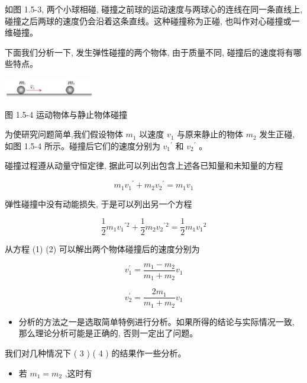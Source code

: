 \documentclass[10pt]{article}
\begin{document}
如图 1.5-3, 两个小球相碰, 碰撞之前球的运动速度与两球心的连线在同一条直线上, 碰撞之后两球的速度仍会沿着这条直线。这种碰撞称为正碰, 也叫作对心碰撞或一维碰撞。

下面我们分析一下, 发生弹性碰撞的两个物体, 由于质量不同, 碰撞后的速度将有哪些特点。

\begin{center}
\includegraphics[max width=0.3\textwidth]{images/01910e4c-ebb8-7d2c-8f2f-2375bc1d2d12_27_408165.jpg}
\end{center}

图 1.5-4 运动物体与静止物体碰撞

为使研究问题简单,我们假设物体 \({m}_{1}\) 以速度 \({v}_{1}\) 与原来静止的物体 \({m}_{2}\) 发生正碰,如图 1.5-4 所示。碰撞后它们的速度分别为 \({v}_{1}{}^{\prime }\) 和 \({v}_{2}{}^{\prime }\) 。

碰撞过程遵从动量守恒定律, 据此可以列出包含上述各已知量和未知量的方程

\[
{m}_{1}{v}_{1}{}^{\prime } + {m}_{2}{v}_{2}{}^{\prime } = {m}_{1}{v}_{1} \tag{1}
\]

弹性碰撞中没有动能损失, 于是可以列出另一个方程

\[
\frac{1}{2}{m}_{1}{v}_{1}{}^{\prime }{}^{2} + \frac{1}{2}{m}_{2}{v}_{2}{}^{\prime }{}^{2} = \frac{1}{2}{m}_{1}{v}_{1}{}^{2} \tag{（2）}
\]

从方程 (1) (2) 可以解出两个物体碰撞后的速度分别为

\[
{v}_{1}^{\prime } = \frac{{m}_{1} - {m}_{2}}{{m}_{1} + {m}_{2}}{v}_{1} \tag{3}
\]

\[
{v}_{2}^{\prime } = \frac{2{m}_{1}}{{m}_{1} + {m}_{2}}{v}_{1} \tag{4}
\]

\begin{mdframed}

\begin{itemize}
\item 分析的方法之一是选取简单特例进行分析。如果所得的结论与实际情况一致, 那么理论分析可能是正确的, 否则一定出了问题。
\end{itemize}

\end{mdframed}

我们对几种情况下 ( 3 ) ( 4 ) 的结果作一些分析。

\begin{itemize}
\item 若 \({m}_{1} = {m}_{2}\) ,这时有
\end{itemize}
\end{document}

